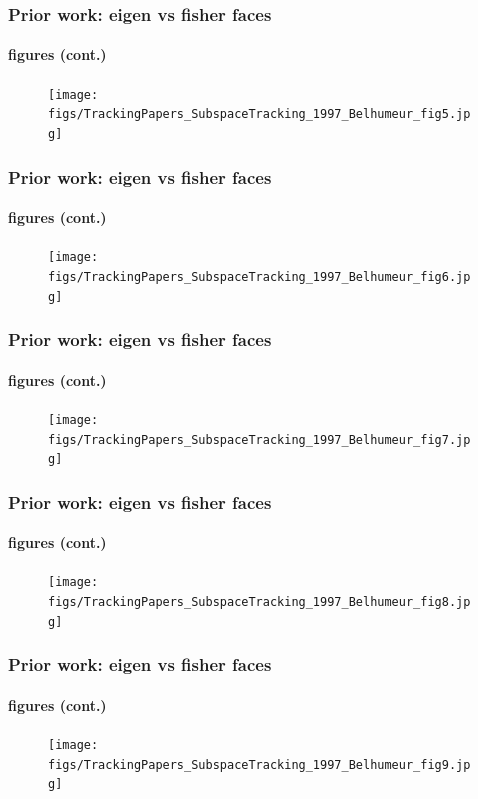 \begin{frame}
\frametitle{Prior work: eigen vs fisher faces}
\framesubtitle{figures (cont.)}
\mypagenum
	\begin{figure}
		\texttt{[image: figs/TrackingPapers\_SubspaceTracking\_1997\_Belhumeur\_fig5.jpg]}
	\end{figure}
\end{frame}



\begin{frame}
\frametitle{Prior work: eigen vs fisher faces}
\framesubtitle{figures (cont.)}
\mypagenum
	\begin{figure}
		\texttt{[image: figs/TrackingPapers\_SubspaceTracking\_1997\_Belhumeur\_fig6.jpg]}
	\end{figure}
\end{frame}



\begin{frame}
\frametitle{Prior work: eigen vs fisher faces}
\framesubtitle{figures (cont.)}
\mypagenum
	\begin{figure}
		\texttt{[image: figs/TrackingPapers\_SubspaceTracking\_1997\_Belhumeur\_fig7.jpg]}
	\end{figure}
\end{frame}



\begin{frame}
\frametitle{Prior work: eigen vs fisher faces}
\framesubtitle{figures (cont.)}
\mypagenum
	\begin{figure}
		\texttt{[image: figs/TrackingPapers\_SubspaceTracking\_1997\_Belhumeur\_fig8.jpg]}
	\end{figure}
\end{frame}



\begin{frame}
\frametitle{Prior work: eigen vs fisher faces}
\framesubtitle{figures (cont.)}
\mypagenum
	\begin{figure}
		\texttt{[image: figs/TrackingPapers\_SubspaceTracking\_1997\_Belhumeur\_fig9.jpg]}
	\end{figure}
\end{frame}




